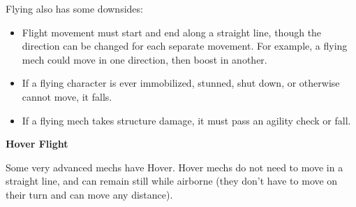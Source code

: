 Flying also has some downsides:
\begin{itemize}
\item Flight movement must start and end along a straight line, though the direction can be changed for each separate movement. For example, a flying mech could move in one direction, then boost in another. 
\item If a flying character is ever immobilized, stunned, shut down, or otherwise cannot move, it falls.
\item If a flying mech takes structure damage, it must pass an agility check or fall.
\end{itemize}



\begin{center}
     \textbf{Hover Flight}
\end{center}

Some very advanced mechs have Hover. Hover mechs do not need to move in a straight line, and can remain still while airborne (they don’t have to move on their turn and can move any distance).